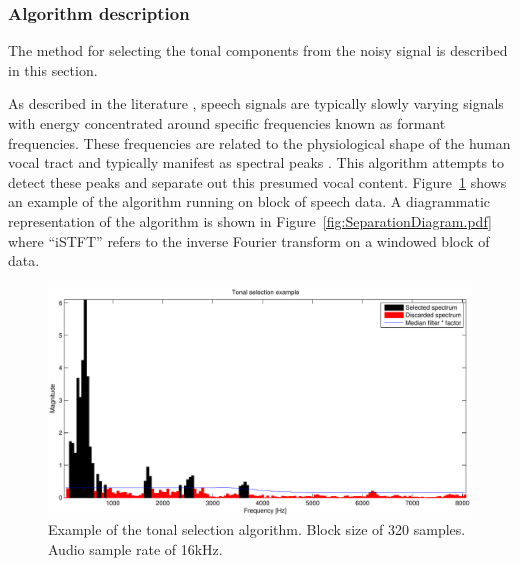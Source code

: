 \subsubsection{Algorithm description}\label{sec:WPdetectionSep}
The method for selecting the tonal components from the noisy signal is described in this section.

As described in the literature \cite{Vaseghi1988thesis}\cite{Vaseghi1990}, speech signals are typically slowly varying signals with energy concentrated around specific frequencies known as formant frequencies. These frequencies are related to the physiological shape of the human vocal tract and typically manifest as spectral peaks \cite{Fant1970}. This algorithm attempts to detect these peaks and separate out this presumed vocal content. Figure~\ref{fig:Separation_Spectrum_Selection.pdf} shows an example of the algorithm running on \DIFaddbegin {}\DIFaddend block of speech data. A diagrammatic representation of the algorithm is shown in Figure~\ref{fig:SeparationDiagram.pdf} where ``iSTFT'' refers to the inverse Fourier transform on a windowed block of data.

\begin{figure} %
\begin{minipage}[b]{1.0\linewidth}
  \centering
  \centerline{\includegraphics[width=14cm]{Separation_Spectrum_Selection.pdf}}
\end{minipage}
\caption{Example of the tonal selection algorithm. Block size of 320 samples. Audio sample rate of 16kHz.}
\label{fig:Separation_Spectrum_Selection.pdf}
\end{figure}

